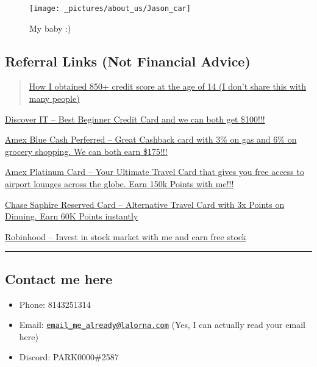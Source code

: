 \documentclass[
]{book}
\providecommand{\tightlist}{%
  \setlength{\itemsep}{0pt}\setlength{\parskip}{0pt}}
\begin{document}
\begin{figure}
\texttt{[image: \_pictures/about\_us/Jason\_car]} \caption{My baby :) }\label{fig:pic-Jason-car}
\end{figure}

\hypertarget{referral-links-not-financial-advice}{%
\subsection{\texorpdfstring{Referral Links (\textbf{Not Financial Advice})}{Referral Links (Not Financial Advice)}}\label{referral-links-not-financial-advice}}

\begin{quote}
\href{https://www.youtube.com/watch?v=dQw4w9WgXcQ}{How I obtained 850+ credit score at the age of 14 (I don't share this with many people)}
\end{quote}

\href{https://refer.discover.com/s/XIAODI7}{Discover IT -- Best Beginner Credit Card and we can both get \$100!!!}

\href{https://americanexpress.com/en-us/referral/XIAODPhiSr?XLINK=MYCP}{Amex Blue Cash Perferred -- Great Cashback card with 3\% on gas and 6\% on grocery shopping. We can both earn \$175!!!}

\href{https://americanexpress.com/en-us/referral/XIAODPlxv9?XLINK=MYCP}{Amex Platinum Card -- Your Ultimate Travel Card that gives you free access to airport lounges across the globe. Earn 150k Points with me!!!}

\href{https://www.referyourchasecard.com/6f/Q857WY1O6N}{Chase Saphire Reserved Card -- Alternative Travel Card with 3x Points on Dinning. Earn 60K Points instantly}

\href{https://join.robinhood.com/xiaodip}{Robinhood -- Invest in stock market with me and earn free stock}

\begin{center}\rule{0.5\linewidth}{0.5pt}\end{center}

\hypertarget{contact-me-here}{%
\subsection{Contact me here}\label{contact-me-here}}

\begin{itemize}
\tightlist
\item
  Phone: 8143251314
\item
  Email: \href{mailto:email_me_already@lalorna.com}{\nolinkurl{email\_me\_already@lalorna.com}} (Yes, I can actually read your email here)
\item
  Discord: PARK0000\#2587
\end{itemize}
\end{document}
